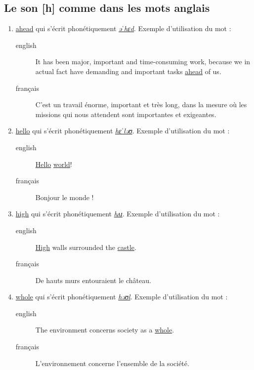 \documentclass[12pt,a4paper]{book}
\begin{document}
\subsection{Le son [h] comme dans les mots anglais}
\label{sec:orga471592}
\begin{enumerate}
\item \href{http://www.wordreference.com/enfr/ahead}{ahead} qui s'écrit phonétiquement \href{https://en.oxforddictionaries.com/definition/ahead}{\emph{əˈhɛd}}. Exemple d'utilisation du mot : 
\begin{description}
\item[{english}] \textenglish{It has been major, important and time-consuming work,
because we in actual fact have demanding and important tasks
\href{https://youtu.be/1rLpIOzKaBA}{ahead} of us.}
\item[{français}] C'est un travail énorme, important et très long, dans
la mesure où les missions qui nous attendent sont importantes
et exigeantes.
\end{description}
\item \href{http://www.wordreference.com/enfr/hello}{hello} qui s'écrit phonétiquement \href{https://en.oxforddictionaries.com/definition/hello}{\emph{hɛˈləʊ}}. Exemple d'utilisation du mot :
\begin{description}
\item[{english}] \textenglish{\href{https://youtu.be/62XB9IbMnxQ}{Hello} \href{https://en.wikipedia.org/wiki/\%2522Hello,\_World!\%2522\_program}{world}!}
\item[{français}] Bonjour le monde !
\end{description}
\item \href{http://www.wordreference.com/enfr/high}{high} qui s'écrit phonétiquement \href{https://en.oxforddictionaries.com/definition/high}{\emph{hʌɪ}}. Exemple d'utilisation du mot :
\begin{description}
\item[{english}] \textenglish{\href{https://youtu.be/F7lj4LknWO8}{High} walls surrounded the \href{https://youtu.be/hclQLklBHNs}{castle}.}
\item[{français}] De hauts murs entouraient le château.
\end{description}
\item \href{http://www.wordreference.com/enfr/whole}{whole} qui s'écrit phonétiquement \href{https://en.oxforddictionaries.com/definition/whole}{\emph{həʊl}}. Exemple d'utilisation du mot :
\begin{description}
\item[{english}] \textenglish{The environment concerns society as a \href{https://youtu.be/bJnw1ma6Xks}{whole}.}
\item[{français}] L'environnement concerne l'ensemble de la société.
\end{description}
\end{enumerate}
\end{document}
